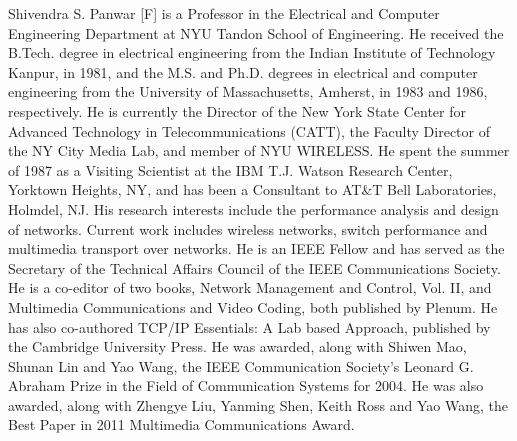 \documentclass[journal]{IEEEtran}
\begin{document}
\begin{IEEEbiography}{Shivendra S. Panwar}
[F] is a Professor in the Electrical and Computer Engineering Department at NYU Tandon School of Engineering. He received the B.Tech. degree in electrical engineering from the Indian Institute of Technology Kanpur, in 1981, and the M.S. and Ph.D. degrees in electrical and computer engineering from the University of Massachusetts, Amherst, in 1983 and 1986, respectively. He is currently the Director of the New York State Center for Advanced Technology in Telecommunications (CATT), the Faculty Director of the NY City Media Lab, and member of NYU WIRELESS. He spent the summer of 1987 as a Visiting Scientist at the IBM T.J. Watson Research Center, Yorktown Heights, NY, and has been a Consultant to AT\&T Bell Laboratories, Holmdel, NJ. His research interests include the performance analysis and design of networks. Current work includes wireless networks, switch performance and multimedia transport over networks. He is an IEEE Fellow and has served as the Secretary of the Technical Affairs Council of the IEEE Communications Society. He is a co-editor of two books, Network Management and Control, Vol. II, and Multimedia Communications and Video Coding, both published by Plenum. He has also co-authored TCP/IP Essentials: A Lab based Approach, published by the Cambridge University Press. He was awarded, along with Shiwen Mao, Shunan Lin and Yao Wang, the IEEE Communication Society's Leonard G. Abraham Prize in the Field of Communication Systems for 2004. He was also awarded, along with Zhengye Liu, Yanming Shen, Keith Ross and Yao Wang, the Best Paper in 2011 Multimedia Communications Award.
\end{IEEEbiography}
\end{document}
